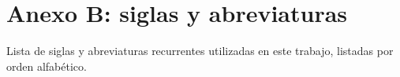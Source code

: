 \cleardoublepage{}
{}
\FormatoAnexoB

\RemoveLabelsAxUno

\AddLabelsAxDos

\let\originalstyle=\thispagestyle            %
\def\thispagestyle#1{\fancyfoot[C]{}}       %
\def\thispagestyle#1{\originalstyle{empty}} %
\def\thispagestyle#1{}                       %
\clearpage
\chapter*{Anexo B: siglas y abreviaturas}

\noindent Lista de siglas y abreviaturas recurrentes utilizadas en este trabajo, listadas por orden alfabético.
\vspace*{0.6cm}
\begin{normalsize}  		 %
\printacronyms[heading=none]
\end{normalsize}

\let\thispagestyle=\originalstyle 
